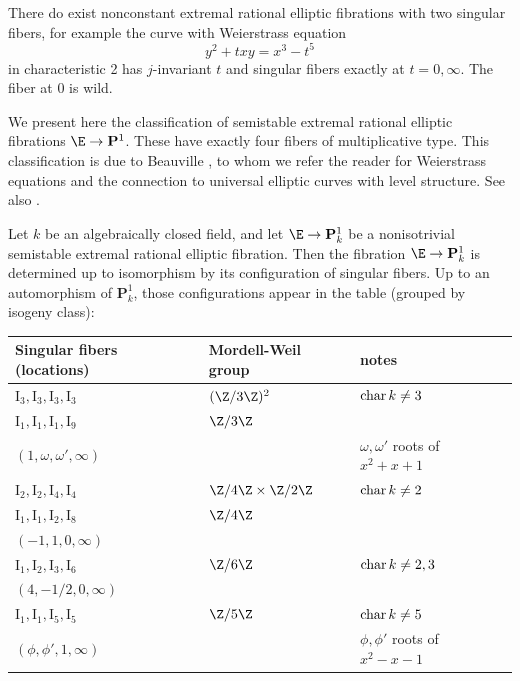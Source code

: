 \documentclass{article}
\DeclareMathOperator{\car}{{\rm char}}
\def\P{\mathbf{P}}
\newcommand{\I}{\mathrm{I}}
\begin{document}
\begin{rmk}  There do exist nonconstant extremal rational elliptic fibrations with two singular fibers, for example the curve with Weierstrass equation
\[ y^2+txy=x^3-t^5 \]
in characteristic 2 has $j$-invariant $t$ and singular fibers exactly at $t=0,\infty$.  The fiber at $0$ is wild.
\end{rmk}

We present here the classification of semistable extremal rational elliptic fibrations $\E\to \P^1$.  These have exactly four fibers of multiplicative type.  This classification is due to Beauville \cite{Beauville}, to whom we refer the reader for Weierstrass equations and the connection to universal elliptic curves with level structure.   See also \cite{Ito}.

\begin{prop}\label{PropClassificationSemistable}  Let $k$ be an algebraically closed field, and let $\E\to \P^1_k$ be a nonisotrivial semistable extremal rational elliptic fibration.   Then the fibration $\E\to\P^1_k$ is determined up to isomorphism by its configuration of singular fibers.  Up to an automorphism of $\P^1_k$, those configurations appear in the table (grouped by isogeny class):

\begin{center}
\begin{tabular}{|l|l|l|}
\hline
Singular fibers (locations) & Mordell-Weil group & notes \\
\hline \hline
$\I_3,\I_3,\I_3,\I_3$ & $(\Z/3\Z)^2$ & $\car k\neq 3$\\

$\I_1,\I_1,\I_1,\I_9$ & $\Z/3\Z$ & \\
\hline
$(1,\omega,\omega',\infty)$ & & $\omega,\omega'$ roots of $x^2+x+1$ \\
\hline \hline
$\I_2,\I_2,\I_4,\I_4$ & $\Z/4\Z\times\Z/2\Z$ & $\car k\neq 2$\\

$\I_1,\I_1,\I_2,\I_8$ & $\Z/4\Z$ & \\
\hline
$(-1,1,0,\infty)$ & & \\
\hline \hline
$\I_1,\I_2,\I_3,\I_6$ & $\Z/6\Z$ & $\car k \neq 2,3$\\
\hline
$(4,-1/2,0,\infty)$ & &  \\
\hline \hline
$\I_1,\I_1,\I_5,\I_5$ & $\Z/5\Z$ & $\car k \neq 5$\\
\hline
$(\phi,\phi',1,\infty)$ & & $\phi,\phi'$ roots of $x^2-x-1$\\
\hline
\end{tabular}
\end{center}
\end{prop}
\end{document}
